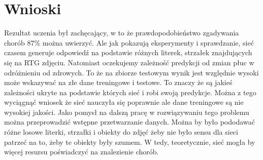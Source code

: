 \documentclass{article}
\begin{document}
\section{Wnioski}
Rezultat uczenia był zachęcający, w to że prawdopodobieństwo zgadywania chorób 87\% można uwierzyć. Ale jak pokazują eksperymenty i sprawdzanie, sieć czasem generuje odpowiedź na podstawie różnych literek, strzałek znajdujących się na RTG zdjęciu. Natomiast oczekujemy zależność predykcji od zmian płuc w odróżnieniu od zdrowych. To że na zbiorze testowym wynik jest względnie wysoki może wskazywać na złe dane treningowe i testowe. To znaczy że są jakieś zależności ukryte na podstawie których sieć i robi swoją predykcje. Można z tego wyciągnąć wniosek że sieć nauczyła się poprawnie ale dane treningowe są nie wysokiej jakości. Jako pomysł na dalszą pracę w rozwiązywaniu tego problemu można przeprowadzić wstępne przetwarzanie danych. Można by było pododawać różne losowe literki, strzałki i obiekty do zdjęć żeby nie było sensu dla sieci patrzeć na to, żeby te obiekty były szumem. W tedy, teoretycznie, sieć mogła by więcej resursu poświadczyć na znalezienie chorób.


	
\end{document}
